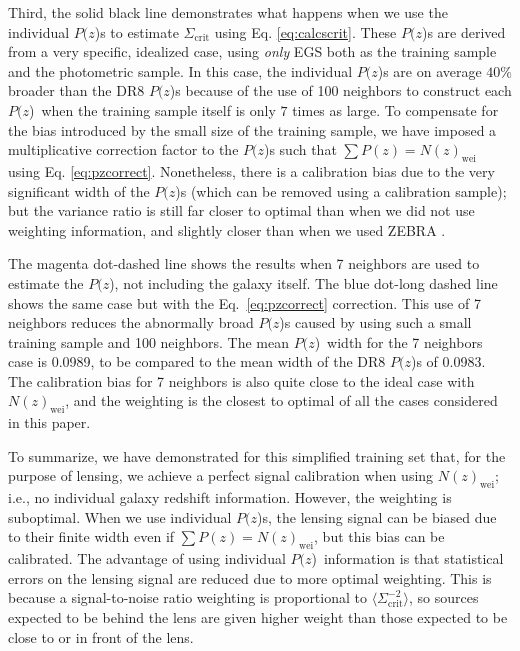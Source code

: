 \documentclass[preprint]{aastex}
\newcommand{\pofz}{$P(z$)}
\begin{document}
Third, the solid black line demonstrates what happens when we use the individual
\pofz s to estimate $\Sigma_\mathrm{crit}$ using Eq. \ref{eq:calcscrit}.  These
\pofz s are derived from a very specific, idealized case, using {\em only} EGS
both as the training sample and the photometric sample.  In this case, the
individual \pofz s are on average $40\%$ broader than the DR8 \pofz s because of
the use of 100 neighbors to construct each \pofz\ when the training sample
itself is only $7$ times as large.  To compensate for the bias introduced by
the small size of the training sample, we have imposed a multiplicative
correction factor to the \pofz s such that $\sum P(z) = N(z)_\mathrm{wei}$ using
Eq. \ref{eq:pzcorrect}.  Nonetheless, there is a calibration bias due to the
very significant width of the \pofz s (which can be removed using a calibration
sample); but the variance ratio is still far closer to optimal than when we did
not use weighting information, and slightly closer than when we used ZEBRA
\photoz.  

The magenta dot-dashed line shows the results when 7 neighbors are used to
estimate the \pofz, not including the galaxy itself. The blue dot-long dashed
line shows the same case but with the Eq.~\ref{eq:pzcorrect} correction.  This
use of 7 neighbors reduces the abnormally broad \pofz s caused by using such a
small training sample and 100 neighbors.  The mean \pofz\ width for the 7
neighbors case is 0.0989, to be compared to the mean width of the DR8 \pofz s of
0.0983. The calibration bias for 7 neighbors is also quite close to the ideal
case with $N(z)_\mathrm{wei}$, and the weighting is the closest to optimal of
all the cases considered in this paper.

To summarize, we have demonstrated for this simplified training set that, for
the purpose of lensing, we achieve a perfect signal calibration when using
$N(z)_\mathrm{wei}$; i.e., no individual galaxy redshift information.  However,
the weighting is suboptimal.  When we use individual \pofz s, the lensing signal
can be biased due to their finite width even if $\sum P(z) =
N(z)_\mathrm{wei}$, but this bias can be calibrated.  The advantage of
using individual \pofz\ information is that statistical errors on the lensing
signal are reduced due to more optimal weighting.  This is because a
signal-to-noise ratio weighting is proportional to $\langle \Sigma_{\mathrm{crit}}^{-2}
\rangle$, so sources expected to be behind the lens are given higher weight
than those expected to be close to or in front of the lens.
\end{document}

